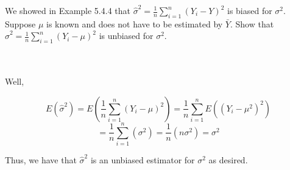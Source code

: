 We showed in Example 5.4.4 that $\hat{\sigma}^2=\frac1n\sum_{i=1}^n(Y_i -Y)^2$ is biased for $\sigma^2$.
Suppose $\mu$ is known and does not have to be estimated by $\bar{Y}$. Show that
$\hat{\sigma}^2=\frac1n\sum_{i=1}^n(Y_i-\mu)^2$ is unbiased for $\sigma^2$.\\\\

\begin{solution}\renewcommand{\qedsymbol}{}\ \\
    Well,
    
    $$E(\hat{\sigma}^2)=E(\frac1n\sum_{i=1}^n(Y_i-\mu)^2)=\frac1n\sum_{i=1}^nE((Y_i-\mu^2)^2)$$
    $$=\frac1n\sum_{i=1}^n(\sigma^2)=\frac1n(n\sigma^2)=\sigma^2$$
    
    Thus, we have that $\hat{\sigma}^2$ is an unbiased estimator for $\sigma^2$ as desired.

\end{solution}